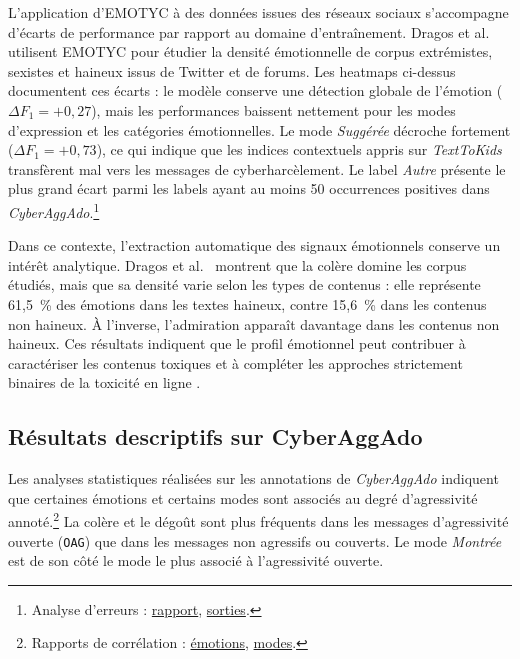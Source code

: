 L'application d'EMOTYC à des données issues des réseaux sociaux s'accompagne d'écarts de performance par rapport au domaine d'entraînement. Dragos et al.~\citep{dragos2024exploring} utilisent EMOTYC pour étudier la densité émotionnelle de corpus extrémistes, sexistes et haineux issus de Twitter et de forums. Les heatmaps ci-dessus documentent ces écarts : le modèle conserve une détection globale de l'émotion ($\Delta F_1 = +0{,}27$), mais les performances baissent nettement pour les modes d'expression et les catégories émotionnelles. Le mode \textit{Suggérée} décroche fortement ($\Delta F_1 = +0{,}73$), ce qui indique que les indices contextuels appris sur \textit{TextToKids} transfèrent mal vers les messages de cyberharcèlement. Le label \textit{Autre} présente le plus grand écart parmi les labels ayant au moins 50 occurrences positives dans \textit{CyberAggAdo}.\footnote{Analyse d'erreurs : \href{https://github.com/GwenTsang/Eval-EMOTYC/blob/main/results/rapport_performances.md}{rapport}, \href{https://github.com/GwenTsang/EMOTYC/tree/master/experimentations/error_analysis_results}{sorties}.}

Dans ce contexte, l'extraction automatique des signaux émotionnels conserve un intérêt analytique. Dragos et al.~\citep{dragos2024exploring} montrent que la colère domine les corpus étudiés, mais que sa densité varie selon les types de contenus : elle représente 61,5~\% des émotions dans les textes haineux, contre 15,6~\% dans les contenus non haineux. À l'inverse, l'admiration apparaît davantage dans les contenus non haineux. Ces résultats indiquent que le profil émotionnel peut contribuer à caractériser les contenus toxiques et à compléter les approches strictement binaires de la toxicité en ligne \citep{dragos2024exploring,battistelli2025introduction}.

\subsection{Résultats descriptifs sur CyberAggAdo}

Les analyses statistiques réalisées sur les annotations de \textit{CyberAggAdo} indiquent que certaines émotions et certains modes sont associés au degré d'agressivité annoté.\footnote{Rapports de corrélation : \href{https://github.com/GwenTsang/ExpressionEmotionnelle/blob/main/results/hate_emotions_correlation_report.md}{émotions}, \href{https://github.com/GwenTsang/ExpressionEmotionnelle/blob/main/results/hate_modes_correlation_report.md}{modes}.} La colère et le dégoût sont plus fréquents dans les messages d'agressivité ouverte (\texttt{OAG}) que dans les messages non agressifs ou couverts. Le mode \textit{Montrée} est de son côté le mode le plus associé à l'agressivité ouverte.

